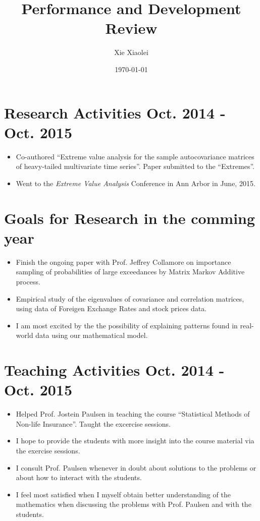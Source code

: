 \documentclass{article}
\title{Performance and Development Review}
\author{Xie Xiaolei}
\date{\today}
\newif\ifALL
\begin{document}
\maketitle

\ifALL
\section{Research Activities Oct. 2014 - Oct. 2015}
\begin{itemize}
\item Co-authored ``Extreme value analysis for the sample
  autocovariance matrices of heavy-tailed multivariate time
  series''. Paper submitted to the ``Extremes''.
\item Went to the {\it Extreme Value Analysis} Conference in Ann Arbor
  in June, 2015.
\end{itemize}

\section{Goals for Research in the comming year}
\begin{itemize}
\item Finish the ongoing paper with Prof. Jeffrey Collamore on
  importance sampling of probabilities of large exceedances by Matrix
  Markov Additive process.
\item Empirical study of the eigenvalues of covariance and correlation
  matrices, using data of Foreigen Exchange Rates and stock prices
  data.
\item I am most excited by the the possibility of explaining patterns
  found in real-world data using our mathematical model.
\end{itemize}

\section{Teaching Activities Oct. 2014 - Oct. 2015}
\begin{itemize}
\item Helped Prof. Jostein Paulsen in teaching the course
  ``Statistical Methods of Non-life Insurance''. Taught the excercise
  sessions.
\item I hope to provide the students with more insight into the course
  material via the exercise sessions.
\item I consult Prof. Paulsen whenever in doubt about solutions to the
  problems or about how to interact with the students.
\item I feel most satisfied when I myself obtain better understanding
  of the mathematics when discussing the problems with Prof. Paulsen
  and with the students.
\end{itemize}
\end{document}

